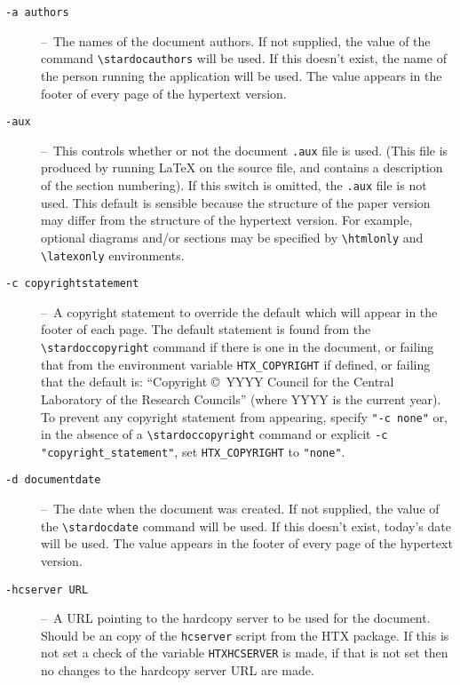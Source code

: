 \documentclass[twoside,11pt]{article}
\newcommand{\stardoccopyright} 
{Copyright \copyright\ 2000-2004 Council for the Central Laboratory of the
Research Councils \newline\
Copyright \copyright\ 2008-2009 Science and Technology Facilities Council}
\newcommand{\stardocauthors}   {P W Draper\\
                                A J Chipperfield\\
                                M D Lawden}
\newcommand{\stardocdate}      {26 January 2009}
\renewcommand{\_}{\texttt{\symbol{95}}}
\newcommand{\dash}{--}
\newcommand{\dash}{-}
\begin{document}
\begin{description}

\item[\texttt{-a authors}] \dash\
   The names of the document authors.
   If not supplied, the value of the command \verb#\stardocauthors# will be
   used.
   If this doesn't exist, the name of the person running the application will
   be used.
   The value appears in the footer of every page of the hypertext version.

\item[\texttt{-aux}] \dash\
   This controls whether or not the document \texttt{.aux} file is used.
   (This file is produced by running LaTeX on the source file, and contains a
   description of the section numbering).
   If this switch is omitted, the \texttt{.aux} file is not used.
   This default is sensible because the structure of the paper version
   may differ from the structure of the hypertext version.
   For example, optional diagrams and/or sections may be specified by
   \verb+\htmlonly+ and \verb+\latexonly+ environments.

\item[\texttt{-c copyright\_statement}] \dash\
   A copyright statement to override the default which will appear
   in the footer of each page. The default statement is found from
   the \verb#\stardoccopyright# command if there is one in the document, or 
   failing that from the environment variable \verb#HTX_COPYRIGHT# if defined,
   or failing that the default is: ``Copyright \copyright\ YYYY Council for
   the Central Laboratory of the Research Councils'' (where YYYY is the
   current year).
   To prevent any copyright statement from appearing, specify \verb#"-c none"#
   or, in the absence of a \verb#\stardoccopyright# command or explicit
   \verb#-c "copyright_statement"#, set  \verb#HTX_COPYRIGHT# to \verb#"none"#.

\item[\texttt{-d document\_date}] \dash\
   The date when the document was created.
   If not supplied, the value of the \verb#\stardocdate# command will be used.
   If this doesn't exist, today's date will be used.
   The value appears in the footer of every page of the hypertext version.

\item[\texttt{-hcserver URL}] \dash\
   A URL pointing to the hardcopy server to be used for the document.
   Should be an copy of the \texttt{hcserver} script from the HTX package.
   If this is not set a check of the variable \texttt{HTX\_HCSERVER} is made,
   if that is not set then no changes to the hardcopy server URL are made.


\end{description}
\end{document}
